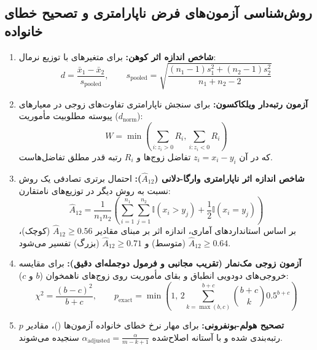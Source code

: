 \documentclass[oneside,openany,phd]{TMU-Thesis}
\begin{document}
\subsection{روش‌شناسی آزمون‌های فرض ناپارامتری و تصحیح خطای خانواده}
\begin{enumerate}
    \item \textbf{شاخص اندازه اثر کوهن:} برای متغیرهای با توزیع نرمال:
    \begin{equation}
    d = \frac{\bar{x}_1 - \bar{x}_2}{s_{\text{pooled}}}, \qquad s_{\text{pooled}} = \sqrt{\frac{(n_1 - 1)s_1^2 + (n_2 - 1)s_2^2}{n_1 + n_2 - 2}}
    \end{equation}
    \item \textbf{آزمون رتبه‌دار ویلکاکسون:} برای سنجش ناپارامتری تفاوت‌های زوجی در معیارهای پیوسته مطلوبیت مأموریت ($d_{\text{norm}}$):
    \begin{equation}
    W = \min\left(\sum_{i: z_i > 0} R_i, \sum_{i: z_i < 0} R_i\right)
    \end{equation}
    که در آن $z_i = x_i - y_i$ تفاضل زوج‌ها و $R_i$ رتبه قدر مطلق تفاضل‌هاست.
    \item \textbf{شاخص اندازه اثر ناپارامتری وارگا-دلانی ($\hat{A}_{12}$):} احتمال برتری تصادفی یک روش نسبت به روش دیگر در توزیع‌های نامتقارن:
    \begin{equation}
    \hat{A}_{12} = \frac{1}{n_1 n_2} \left( \sum_{i=1}^{n_1} \sum_{j=1}^{n_2} \mathbb{I}(x_i > y_j) + \frac{1}{2} \mathbb{I}(x_i = y_j) \right)
    \end{equation}
    بر اساس استانداردهای آماری، اندازه اثر بر مبنای مقادیر $\hat{A}_{12} \ge 0.56$ (کوچک)، $\hat{A}_{12} \ge 0.64$ (متوسط) و $\hat{A}_{12} \ge 0.71$ (بزرگ) تفسیر می‌شود.
    \item \textbf{آزمون زوجی مک‌نمار (تقریب مجانبی و فرمول دوجمله‌ای دقیق):} برای مقایسه خروجی‌های دودویی انطباق و بقای مأموریت روی زوج‌های ناهمخوان ($b$ و $c$):
    \begin{equation}
    \chi^2 = \frac{(b - c)^2}{b + c}, \qquad p_{\text{exact}} = \min\!\left(1,\, 2 \sum_{k=\max(b,c)}^{b+c} \binom{b+c}{k} 0.5^{b+c}\right)
    \end{equation}
    \item \textbf{تصحیح هولم-بونفرونی:} برای مهار نرخ خطای خانواده آزمون‌ها ()، مقادیر $p$ رتبه‌بندی شده و با آستانه اصلاح‌شده $\alpha_{\text{adjusted}} = \frac{\alpha}{m - k + 1}$ سنجیده می‌شوند.
\end{enumerate}
\end{document}
